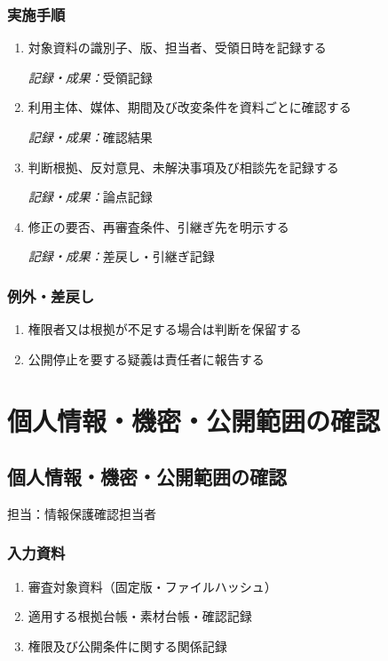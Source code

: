 \documentclass[a4paper,11pt]{article}
\begin{document}
\subsubsection*{実施手順}
\begin{enumerate}[leftmargin=2em,itemsep=0.65em]
\item 対象資料の識別子、版、担当者、受領日時を記録する\par\noindent\textit{記録・成果：}受領記録\nobreak\smallskip
\item 利用主体、媒体、期間及び改変条件を資料ごとに確認する\par\noindent\textit{記録・成果：}確認結果\nobreak\smallskip
\item 判断根拠、反対意見、未解決事項及び相談先を記録する\par\noindent\textit{記録・成果：}論点記録\nobreak\smallskip
\item 修正の要否、再審査条件、引継ぎ先を明示する\par\noindent\textit{記録・成果：}差戻し・引継ぎ記録\nobreak\smallskip
\end{enumerate}
\subsubsection*{例外・差戻し}
\begin{enumerate}[leftmargin=2em,itemsep=0.35em]
\item 権限者又は根拠が不足する場合は判断を保留する
\item 公開停止を要する疑義は責任者に報告する
\end{enumerate}
\section{個人情報・機密・公開範囲の確認}
\subsection{個人情報・機密・公開範囲の確認}
\par 担当：情報保護確認担当者\par\medskip
\subsubsection*{入力資料}
\begin{enumerate}[leftmargin=2em,itemsep=0.35em]
\item 審査対象資料（固定版・ファイルハッシュ）
\item 適用する根拠台帳・素材台帳・確認記録
\item 権限及び公開条件に関する関係記録
\end{enumerate}
\end{document}
